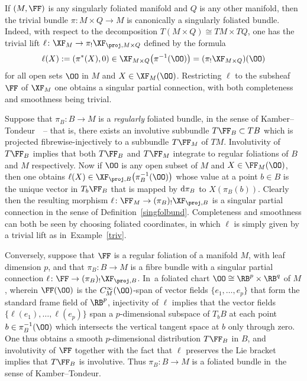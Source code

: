 \begin{Example}\label{triv}
If $(M,\FF)$ is any singularly foliated manifold and $Q$ is any other manifold, then the trivial bundle $\pi\colon M\times Q\rightarrow M$ is canonically a singularly foliated bundle. Indeed, with respect to the decomposition $T(M\times Q)\cong TM\times TQ$, one has the trivial lift $\ell\colon \XF_{M}\rightarrow\pi_{!}\XF_{\proj,M\times Q}$ defined by the formula
\begin{gather*}
\ell(X):=(\pi^{*}(X),0)\in\XF_{M\times Q}\big(\pi^{-1}(\OO)\big) = (\pi_{!}\XF_{M\times Q})(\OO)
\end{gather*}
for all open sets $\OO$ in $M$ and $X\in\XF_{M}(\OO)$. Restricting $\ell$ to the subsheaf $\FF$ of $\XF_{M}$ one obtains a singular partial connection, with both completeness and smoothness being trivial.
\end{Example}

\begin{Example}\label{regex}
Suppose that $\pi_{B}\colon B\rightarrow M$ is a \textit{regularly} foliated bundle, in the sense of Kamber--Tondeur~\cite[Definition~2.1]{folbund}~-- that is, there exists an involutive subbundle $T\FF_{B}\subset TB$ which is projected fibrewise-injectively to a subbundle $T\FF_{M}$ of $TM$. Involutivity of $T\FF_{B}$ implies that both $T\FF_{B}$ and $T\FF_{M}$ integrate to regular foliations of $B$ and $M$ respectively. Now if $\OO$ is any open subset of $M$ and $X\in\FF_{M}(\OO)$, then one obtains $\ell(X)\in\XF_{\proj,B}\big(\pi_{B}^{-1}(\OO)\big)$ whose value at a point $b\in B$ is the unique vector in $T_{b}\FF_{B}$ that is mapped by ${\rm d}\pi_{B}$ to $X(\pi_{B}(b))$. Clearly then the resulting morphism $\ell\colon \FF_{M}\rightarrow(\pi_{B})_{!}\XF_{\proj,B}$ is a singular partial connection in the sense of Definition~\ref{singfolbund}. Completeness and smoothness can both be seen by choosing foliated coordinates, in which $\ell$ is simply given by a trivial lift as in~Example~\ref{triv}.

Conversely, suppose that $\FF$ is a regular foliation of a manifold $M$, with leaf dimension $p$, and that $\pi_{B}\colon B\rightarrow M$ is a fibre bundle with a singular partial connection $\ell\colon \FF\rightarrow(\pi_{B})_{!}\XF_{\proj,B}$. In~a foliated chart $\OO\cong\RB^{p}\times\RB^{q}$ of $M$, wherein $\FF(\OO)$ is the $C^{\infty}_{M}(\OO)$-span of vector fields $\{e_{1},\dots,e_{p}\}$ that form the standard frame field of $\RB^{p}$, injectivity of $\ell$ implies that the vector fields $\{\ell(e_{1}),\dots,\ell(e_{p})\}$ span a $p$-dimensional subspace of $T_{b}B$ at each point $b\in\pi_{B}^{-1}(\OO)$ which intersects the vertical tangent space at $b$ only through zero. One thus obtains a smooth $p$-dimensional distribution $T\FF_{B}$ in $B$, and involutivity of $\FF$ together with the fact that $\ell$ preserves the Lie bracket implies that $T\FF_{B}$ is involutive. Thus $\pi_{B}\colon B\rightarrow M$ is a foliated bundle in~the sense of Kamber--Tondeur.
\end{Example}

